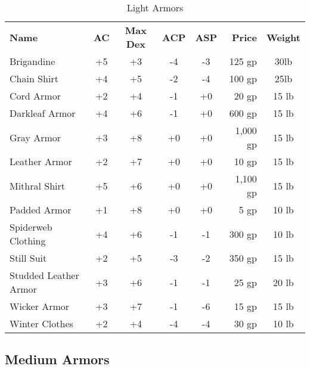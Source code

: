 \begin{table}[htb]
\caption{Light Armors}
\centering
\begin{tabular}{l *{4}{c} r c}
\textbf{Name} & \textbf{AC} & \textbf{Max Dex} & \textbf{ACP} & \textbf{ASP} & \textbf{Price} & \textbf{Weight}\\
Brigandine & +5 & +3 & -4 & -3 & 125 gp & 30lb\\
Chain Shirt & +4 & +5 & -2 & -4 & 100 gp & 25lb\\
Cord Armor & +2 & +4 & -1 & +0 & 20 gp & 15 lb\\
Darkleaf Armor & +4 & +6 & -1 & +0 & 600 gp & 15 lb\\
Gray Armor & +3 & +8 & +0 & +0 & 1,000 gp & 15 lb\\
Leather Armor & +2 & +7 & +0 & +0 & 10 gp & 15 lb\\
Mithral Shirt & +5 & +6 & +0 & +0 & 1,100 gp & 15 lb\\
Padded Armor & +1 & +8 & +0 & +0 & 5 gp & 10 lb\\
Spiderweb Clothing & +4 & +6 & -1 &  -1 & 300 gp & 10 lb\\
Still Suit & +2 & +5 & -3 & -2 & 350 gp & 15 lb\\
Studded Leather Armor & +3 & +6 & -1 & -1 & 25 gp & 20 lb\\
Wicker Armor & +3 & +7 & -1 & -6 & 15 gp & 15 lb\\
Winter Clothes & +2 & +4 & -4 & -4 & 30 gp & 10 lb\\
\end{tabular}
\end{table}


\subsection{Medium Armors}

